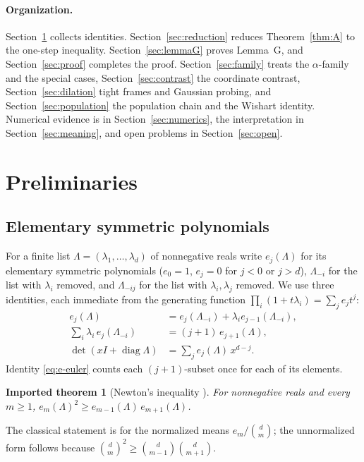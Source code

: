 \documentclass[11pt,a4paper]{article}
\newtheorem{imported}[theorem]{Imported theorem}
\theoremstyle{definition}
\newcommand{\diag}{\operatorname{diag}}
\begin{document}
\paragraph{Organization.} Section~\ref{sec:prelim} collects identities. Section~\ref{sec:reduction} reduces Theorem~\ref{thm:A} to the one-step inequality. Section~\ref{sec:lemmaG} proves Lemma~G, and Section~\ref{sec:proof} completes the proof. Section~\ref{sec:family} treats the $\alpha$-family and the special cases, Section~\ref{sec:contrast} the coordinate contrast, Section~\ref{sec:dilation} tight frames and Gaussian probing, and Section~\ref{sec:population} the population chain and the Wishart identity. Numerical evidence is in Section~\ref{sec:numerics}, the interpretation in Section~\ref{sec:meaning}, and open problems in Section~\ref{sec:open}.
\section{Preliminaries}\label{sec:prelim}

\subsection{Elementary symmetric polynomials}
For a finite list $\Lambda=(\lambda_1,\dots,\lambda_d)$ of nonnegative reals write $e_j(\Lambda)$ for its elementary symmetric polynomials ($e_0=1$, $e_j=0$ for $j<0$ or $j>d$), $\Lambda_{-i}$ for the list with $\lambda_i$ removed, and $\Lambda_{-ij}$ for the list with $\lambda_i,\lambda_j$ removed. We use three identities, each immediate from the generating function $\prod_i(1+t\lambda_i)=\sum_je_jt^j$:
\begin{align}
e_j(\Lambda)&=e_j(\Lambda_{-i})+\lambda_ie_{j-1}(\Lambda_{-i}),\label{eq:e-split}\\
\sum_i\lambda_i\,e_j(\Lambda_{-i})&=(j+1)\,e_{j+1}(\Lambda),\label{eq:e-euler}\\
\det(xI+\diag\Lambda)&=\sum_{j}e_j(\Lambda)\,x^{d-j}.\label{eq:e-charpoly}
\end{align}
Identity \eqref{eq:e-euler} counts each $(j+1)$-subset once for each of its elements.

\begin{imported}[Newton's inequality {\cite[Thm.~51]{HLP}}]\label{imp:newton}
For nonnegative reals and every $m\ge1$, $e_m(\Lambda)^2\ge e_{m-1}(\Lambda)\,e_{m+1}(\Lambda)$.
\end{imported}
The classical statement is for the normalized means $e_m/\binom dm$; the unnormalized form follows because $\binom dm^2\ge\binom d{m-1}\binom d{m+1}$.
\end{document}
